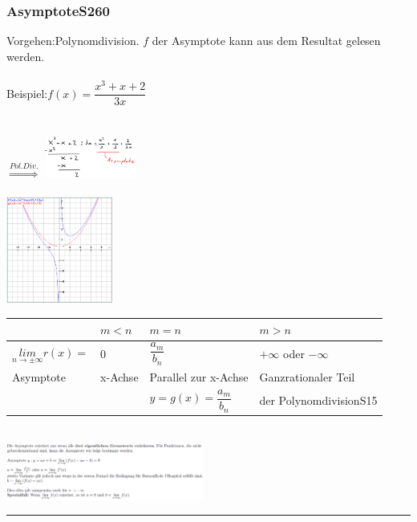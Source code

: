 \documentclass[6pt,a4paper]{scrartcl}
\begin{document}
\begin{multicols*}{2}
\subsubsection{Asymptote\color{red}S260}\begin{multicols}{2}
	Vorgehen:\qquad Polynomdivision. $f$ der Asymptote kann aus dem Resultat gelesen werden.\\
	\\
	Beispiel:\qquad $f(x)=\dfrac{x^{3}+x+2}{3x}$ \\
	\\
	\\
	$\overset{Pol.Div.}{\Longrightarrow}$ \qquad \includegraphics[width=3cm]{Skizze.png} \qquad\\
	\\
	\centering \includegraphics[width=3.5cm]{Graph.PNG}
\end{multicols}
\begin{multicols}{2}
\centering\begin{tabular}{p{1.4cm}|p{8mm}|p{1.3cm}|p{1.5cm}}
	& \tiny $m<n$ & \tiny $m=n$ & \tiny $m>n$\\
	\hline
	\tiny $\underset{n\rightarrow \pm \infty}{lim}r(x)=$ & \tiny 0 & \tiny $\dfrac{a_{m}}{b_{n}}$ & \tiny $+\infty $ oder $-\infty $\\
	\hline
	\tiny Asymptote & \tiny x-Achse & \tiny Parallel zur x-Achse & \tiny Ganzrationaler Teil\\
	&& \tiny $y=g(x)=\dfrac{a_{m}}{b_{n}}$ & \tiny der Polynomdivision\color{red}S15\\	
\end{tabular}\\
\includegraphics[width=6.5cm]{Asymptote.PNG}\\
\end{multicols}
\raggedright
\vspace{1cm}
\hrule

\end{multicols*}
\end{document}
